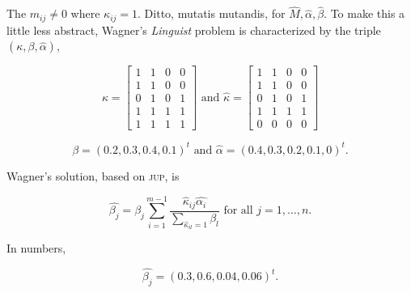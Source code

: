 \documentclass[entropy,article,submit,oneauthor,pdftex,12pt,a4paper]{mdpi}
\newcommand{\intercal}{t}
\begin{document}
{\noindent}The $m_{ij}\neq{}0$ where $\kappa_{ij}=1$. Ditto, mutatis mutandis,
for $\hat{M},\hat{\alpha},\hat{\beta}$. To make this a little less
abstract, Wagner's \emph{Linguist} problem is characterized by the
triple $(\kappa,\beta,\hat{\alpha})$,

\begin{equation}
  \label{eq:m4}
  \kappa=\left[
  \begin{array}{cccc}
    1 & 1 & 0 & 0 \\
    1 & 1 & 0 & 0 \\
    0 & 1 & 0 & 1 \\
    1 & 1 & 1 & 1 \\
    1 & 1 & 1 & 1
  \end{array}
\right]\mbox{ and }
  \hat{\kappa}=\left[
  \begin{array}{cccc}
    1 & 1 & 0 & 0 \\
    1 & 1 & 0 & 0 \\
    0 & 1 & 0 & 1 \\
    1 & 1 & 1 & 1 \\
    0 & 0 & 0 & 0
  \end{array}
\right]
\end{equation}

\begin{equation}
  \label{eq:m5}
  \beta=(0.2,0.3,0.4,0.1)^{\intercal}\mbox{ and }\hat{\alpha}=(0.4,0.3,0.2,0.1,0)^{\intercal}.
\end{equation}

Wagner's solution, based on \textsc{jup}, is

\begin{equation}
  \label{eq:m6}
  \hat{\beta_{j}}=\beta_{j}\sum_{i=1}^{m-1}\frac{\hat{\kappa}_{ij}\hat{\alpha_{i}}}{\sum_{\hat{\kappa}_{il}=1}\beta_{l}}\mbox{ for all }j=1,\ldots,n.
\end{equation}

{\noindent}In numbers,

\begin{equation}
  \label{eq:m7}
  \hat{\beta_{j}}=(0.3,0.6,0.04,0.06)^{\intercal}.
\end{equation}
\end{document}
